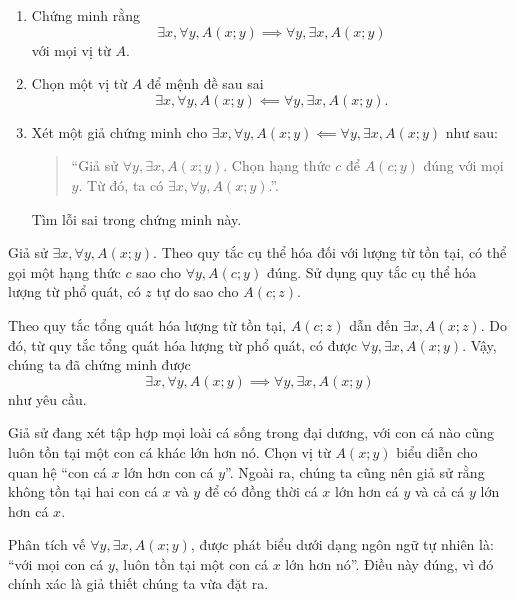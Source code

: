 \exercise 
\begin{enumerate}
   \item Chứng minh rằng \begin{equation*}
      \exists x, \forall y, A(x; y) \implies \forall y, \exists x, A(x; y)
   \end{equation*}
   với mọi vị từ $A$.
   \item Chọn một vị từ $A$ để mệnh đề sau sai
   \begin{equation*}
      \exists x, \forall y, A(x; y) \impliedby \forall y, \exists x, A(x; y).
   \end{equation*}
   \item Xét một giả chứng minh cho $\exists x, \forall y, A(x; y) \impliedby \forall y, \exists x, A(x; y)$ như sau: \begin{quotation}
      ``Giả sử $\forall y, \exists x, A(x; y)$. Chọn hạng thức $c$ để $A(c; y)$ đúng với mọi $y$. Từ đó, ta có $\exists x, \forall y, A(x; y)$.''.
   \end{quotation}
   Tìm lỗi sai trong chứng minh này.
\end{enumerate}

\solution

\resetSubexercise Giả sử $\exists x, \forall y, A(x; y)$. Theo quy tắc cụ thể hóa đối với lượng từ tồn tại, có thể gọi một hạng thức $c$ sao cho $\forall y, A(c; y)$ đúng. Sử dụng quy tắc cụ thể hóa lượng từ phổ quát, có $z$ tự do sao cho $A(c; z)$.

Theo quy tắc tổng quát hóa lượng từ tồn tại, $A(c; z)$ dẫn đến $\exists x, A(x; z)$. Do đó, từ quy tắc tổng quát hóa lượng từ phổ quát, có được $\forall y, \exists x, A(x; y)$. Vậy, chúng ta đã chứng minh được
\begin{equation*}
   \exists x, \forall y, A(x; y) \implies \forall y, \exists x, A(x; y)
\end{equation*}
như yêu cầu.

\stepSubexercise Giả sử đang xét tập hợp mọi loài cá sống trong đại dương, với con cá nào cũng luôn tồn tại một con cá khác lớn hơn nó. Chọn vị từ $A(x; y)$ biểu diễn cho quan hệ ``con cá $x$ lớn hơn con cá $y$''. Ngoài ra, chúng ta cũng nên giả sử rằng không tồn tại hai con cá $x$ và $y$ để có đồng thời cá $x$ lớn hơn cá $y$ và cả cá $y$ lớn hơn cá $x$.

Phân tích vế $\forall y, \exists x, A(x; y)$, được phát biểu dưới dạng ngôn ngữ tự nhiên là: ``với mọi con cá $y$, luôn tồn tại một con cá $x$ lớn hơn nó''. Điều này đúng, vì đó chính xác là giả thiết chúng ta vừa đặt ra.

